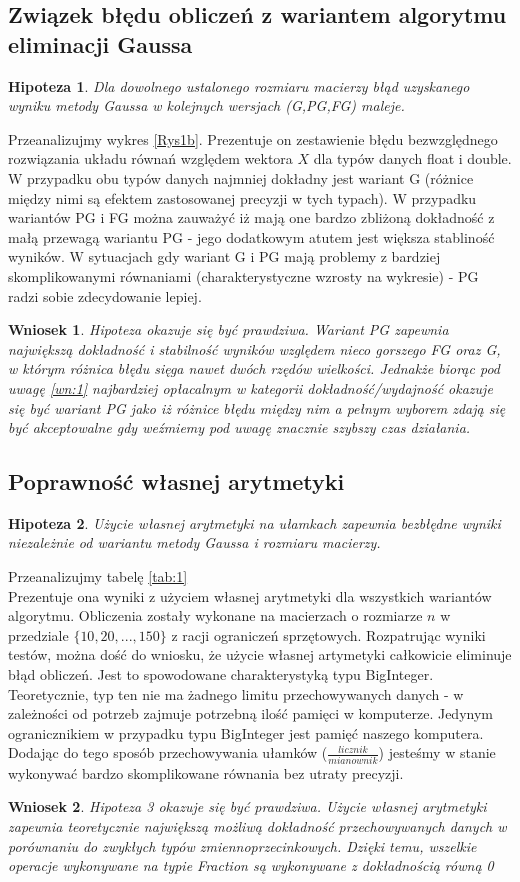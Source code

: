 \documentclass[10pt]{article}
\newtheorem{hip}{Hipoteza}
\newtheorem{wn}{Wniosek}
\begin{document}
\subsection{Związek błędu obliczeń z wariantem algorytmu eliminacji Gaussa}
\begin{hip}
	Dla dowolnego ustalonego rozmiaru macierzy błąd uzyskanego wyniku metody Gaussa w kolejnych wersjach (G,PG,FG) maleje.\label{hip:2}
\end{hip}
Przeanalizujmy wykres \ref{Rys1b}. Prezentuje on zestawienie błędu bezwzględnego rozwiązania układu równań względem wektora $X$ dla typów danych float i double. W przypadku obu typów danych najmniej dokładny jest wariant G (różnice między nimi są efektem zastosowanej precyzji w tych typach). W przypadku wariantów PG i FG można zauważyć iż mają one bardzo zbliżoną dokładność z małą przewagą wariantu PG - jego dodatkowym atutem jest większa stabliność wyników. W sytuacjach gdy wariant G i PG mają problemy z bardziej skomplikowanymi równaniami (charakterystyczne wzrosty na wykresie) - PG radzi sobie zdecydowanie lepiej.
\begin{wn}
	Hipoteza okazuje się być prawdziwa. Wariant PG zapewnia największą dokładność i stabilność wyników względem nieco gorszego FG oraz G, w którym różnica błędu sięga nawet dwóch rzędów wielkości. Jednakże biorąc pod uwagę \ref{wn:1} najbardziej opłacalnym w kategorii dokładność/wydajność okazuje się być wariant PG jako iż różnice błędu między nim a pełnym wyborem zdają się być akceptowalne gdy weźmiemy pod uwagę znacznie szybszy czas działania.\label{wn:2}
\end{wn}
\subsection{Poprawność własnej arytmetyki}
\begin{hip}
	Użycie własnej arytmetyki na ułamkach zapewnia bezbłędne wyniki niezależnie od wariantu metody Gaussa i rozmiaru macierzy.\label{hip:3}
\end{hip}
Przeanalizujmy tabelę \ref{tab:1}\\
Prezentuje ona wyniki z użyciem własnej arytmetyki dla wszystkich wariantów algorytmu.
Obliczenia zostały wykonane na macierzach o rozmiarze $n$ w przedziale $\{10,20,...,150\}$ z racji ograniczeń sprzętowych. Rozpatrując wyniki testów, można dość do wniosku, że użycie własnej artymetyki całkowicie eliminuje błąd obliczeń. Jest to spowodowane charakterystyką typu BigInteger. Teoretycznie, typ ten nie ma żadnego limitu przechowywanych danych - w zależności od potrzeb zajmuje potrzebną ilość pamięci w komputerze. Jedynym ogranicznikiem w przypadku typu BigInteger jest pamięć naszego komputera. Dodając do tego sposób przechowywania ułamków ($\frac{licznik}{mianownik}$) jesteśmy w stanie wykonywać bardzo skomplikowane równania bez utraty precyzji.
\begin{wn}
	Hipoteza 3 okazuje się być prawdziwa. Użycie własnej arytmetyki zapewnia teoretycznie największą możliwą dokładność przechowywanych danych w porównaniu do zwykłych typów zmiennoprzecinkowych. Dzięki temu, wszelkie operacje wykonywane na typie Fraction są wykonywane z dokładnością równą 0\label{wn:3}
\end{wn}
\end{document}

